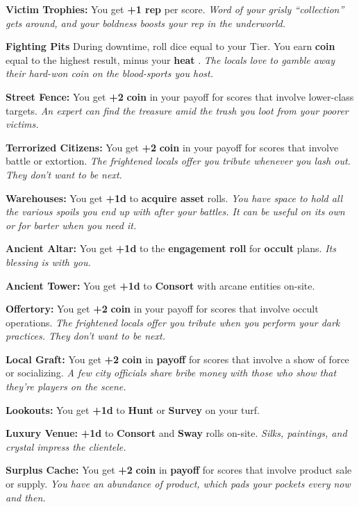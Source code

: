 \documentclass[11pt,oneside]{book}
\newcommand{\gameterm}[1]{\textbf{#1}}
\begin{document}
\gameterm{Victim Trophies:}  You get \textbf{+1 rep} per score. \emph{Word of your grisly “collection” gets around, and your boldness boosts your rep in the underworld.}

\gameterm{Fighting Pits }  During downtime, roll dice equal to your Tier. You earn \gameterm{coin}  equal to the highest result, minus your \gameterm{heat} . \emph{The locals love to gamble away their hard-won coin on the blood-sports you host.}

\gameterm{Street Fence:}  You get \textbf{+2} \gameterm{coin}  in your payoff for scores that involve lower-class targets. \emph{An expert can find the treasure amid the trash you loot from your poorer victims.}

\gameterm{Terrorized Citizens:}  You get \textbf{+2} \gameterm{coin}  in your payoff for scores that involve battle or extortion. \emph{The frightened locals offer you tribute whenever you lash out. They don’t want to be next.}

\gameterm{Warehouses:}  You get \textbf{+1d} to \textbf{acquire asset} rolls. \emph{You have space to hold all the various spoils you end up with after your battles. It can be useful on its own or for barter when you need it.}

\gameterm{Ancient Altar: }  You get \textbf{+1d} to the \textbf{engagement roll} for \textbf{occult} plans. \emph{Its blessing is with you.}

\gameterm{Ancient Tower:}  You get \textbf{+1d} to \gameterm{Consort}  with arcane entities on-site.

\gameterm{Offertory:}  You get \textbf{+2} \gameterm{coin}  in your payoff for scores that involve occult operations. \emph{The frightened locals offer you tribute when you perform your dark practices. They don’t want to be next.}

\gameterm{Local Graft:}  You get \textbf{+2} \gameterm{coin}  in \textbf{payoff} for scores that involve a show of force or socializing. \emph{A few city officials share bribe money with those who show that they’re players on the scene.}

\gameterm{Lookouts: }  You get \textbf{+1d} to \gameterm{Hunt}  or \gameterm{Survey}  on your turf.

\gameterm{Luxury Venue: }  \textbf{+1d} to \gameterm{Consort}  and \gameterm{Sway}  rolls on-site. \emph{Silks, paintings, and crystal impress the clientele.}

\gameterm{Surplus Cache:}  You get \textbf{+2} \gameterm{coin}  in \textbf{payoff} for scores that involve product sale or supply. \emph{You have an abundance of product, which pads your pockets every now and then.}
\end{document}
